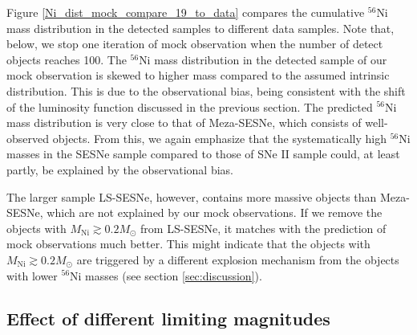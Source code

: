 \documentclass[twocolumn, linenumbers]{aastex62}
\begin{document}
Figure \ref{Ni_dist_mock_compare_19_to_data} compares the cumulative $^{56}$Ni mass distribution in the detected samples to different data samples. Note that, below, we stop one iteration of mock observation when the number of detect objects reaches 100.
The $^{56}$Ni mass distribution in the detected sample of our mock observation is skewed to higher mass compared to the assumed intrinsic distribution. This is due to the observational bias, being consistent with the shift of the luminosity function discussed in the previous section. %
The predicted $^{56}$Ni mass distribution is very close to that of Meza-SESNe, which consists of well-observed objects.
From this, we again emphasize that the systematically high $^{56}$Ni masses in the SESNe sample compared to those of SNe II sample could, at least partly, be explained by the observational bias.

The larger sample LS-SESNe, however, contains more massive objects than Meza-SESNe, which are not explained by our mock observations.
If we remove the objects with $M_{\mathrm{Ni}} \gtrsim 0.2M_{\odot}$ from LS-SESNe, it matches with the prediction of mock observations much better. This might indicate that the objects with  $M_{\mathrm{Ni}} \gtrsim 0.2M_{\odot}$ are triggered by a different explosion mechanism from the objects with lower $^{56}$Ni masses (see section \ref{sec:discussion}). 



\subsection{Effect of different limiting magnitudes} \label{sec:different_vlim}
\end{document}
